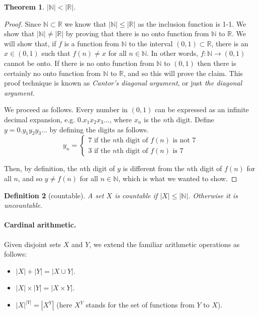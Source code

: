 \documentclass{article}
\theoremstyle{plain}
\newtheorem{theorem}{Theorem}[section]{\bfseries}{\itshape}
\newtheorem{definition}[theorem]{Definition}{\bfseries}{\upshape}
\newcommand{\bN}{\mathbb{N}}
\newcommand{\bR}{\mathbb{R}}
\begin{document}
\begin{theorem}
$|\bN|<|\bR|$.
\end{theorem}
\begin{proof}
Since $\bN\subset \bR$ we know that $|\bN|\leq |\bR|$ as the inclusion function is 1-1. We show that $|\bN|\neq |\bR|$ by proving that there is no onto function from $\bN$ to $\bR$. We will show that, if $f$ is a function from $\bN$ to the interval $(0,1)\subset \bR$, there is an $x\in(0,1)$ such that $f(n)\neq x$ for all $n\in\bN$. In other words, $f:\bN\to(0,1)$ cannot be onto. If there is no onto function from $\bN$ to $(0,1)$ then there is certainly no onto function from $\bN$ to $\bR$, and so this will prove the claim. This proof technique is known as \emph{Cantor's diagonal argument}, or just \emph{the diagonal argument}. 

We proceed as follows. Every number in $(0,1)$ can be expressed as an infinite decimal expansion, e.g. $0.x_1x_2x_3\ldots$, where $x_n$ is the $n$th digit. Define $y=0.y_1y_2y_3\ldots$ by defining the digits as follows. 
\[y_n = \begin{cases} 7 \text{ if the $n$th digit of $f(n)$ is not $7$}\\
3  \text{ if the $n$th digit of $f(n)$ is $7$}\end{cases}\]  

Then, by definition, the $n$th digit of $y$ is different from the $n$th digit of $f(n)$ for all $n$, and so $y\neq f(n)$ for all $n\in\bN$, which is what we wanted to show.
\end{proof}

\begin{definition}[countable]
A set $X$ is \emph{countable} if $|X|\leq|\bN|$. Otherwise it is \emph{uncountable}.
\end{definition}

\paragraph{Cardinal arithmetic.}
Given disjoint sets $X$ and $Y$, we extend the familiar arithmetic operations as follows:
\begin{itemize}
\item $|X|+|Y|=|X\cup Y|$.
\item $|X|\times |Y| = |X\times Y|$.
\item $|X|^{|Y|} = |X^Y|$ (here $X^Y$ stands for the set of functions from $Y$ to $X$).
\end{itemize}
\end{document}
